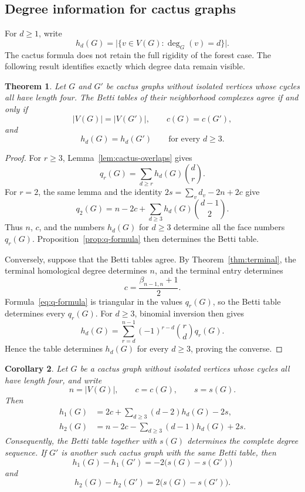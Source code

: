 \documentclass[11pt]{amsart}
\newtheorem{theorem}{Theorem}[section]
\newtheorem{corollary}[theorem]{Corollary}
\theoremstyle{definition}
\theoremstyle{remark}
\numberwithin{equation}{section}
\begin{document}
	\subsection{Degree information for cactus graphs}

	For \(d\ge1\), write
	\[
	h_d(G)=\bigl|\{v\in V(G):\deg_G(v)=d\}\bigr|.
	\]
	The cactus formula does not retain the full rigidity of the forest case. The
	following result identifies exactly which degree data remain visible.

	\begin{theorem}\label{thm:cactus-rigidity}
		Let \(G\) and \(G'\) be cactus graphs without isolated vertices whose cycles
		all have length four. The Betti tables of their neighborhood complexes agree
		if and
		only if
		\[
		|V(G)|=|V(G')|,\qquad c(G)=c(G'),
		\]
		and
		\[
		h_d(G)=h_d(G')\qquad\text{for every }d\ge3.
		\]
	\end{theorem}

	\begin{proof}
		For \(r\ge3\), Lemma~\ref{lem:cactus-overlaps} gives
		\[
		q_r(G)=\sum_{d\ge r}h_d(G)\binom{d}{r}.
		\]
		For \(r=2\), the same lemma and the identity
		\(2s=\sum_v d_v-2n+2c\) give
		\begin{equation}\label{eq:cactus-q2}
		q_2(G)
		=n-2c+\sum_{d\ge3}h_d(G)\binom{d-1}{2}.
		\end{equation}
		Thus \(n\), \(c\), and the numbers \(h_d(G)\) for \(d\ge3\) determine all
		the face numbers \(q_r(G)\). Proposition~\ref{prop:q-formula} then determines
		the Betti table.

		Conversely, suppose that the Betti tables agree. By
		Theorem~\ref{thm:terminal}, the terminal homological degree determines \(n\),
		and the terminal entry determines
		\[
		c=\frac{\beta_{n-1,n}+1}{2}.
		\]
		Formula~\eqref{eq:q-formula} is triangular in the values \(q_r(G)\), so the
		Betti table determines every \(q_r(G)\). For \(d\ge3\), binomial inversion
		then gives
		\begin{equation}\label{eq:cactus-degree-inversion}
		h_d(G)=
		\sum_{r=d}^{n-1}
		(-1)^{r-d}\binom{r}{d}q_r(G).
		\end{equation}
		Hence the table determines \(h_d(G)\) for every \(d\ge3\), proving the
		converse.
	\end{proof}

	\begin{corollary}\label{cor:cactus-low-degrees}
		Let \(G\) be a cactus graph without isolated vertices whose cycles all have
		length four, and write
		\[
		n=|V(G)|,\qquad c=c(G),\qquad s=s(G).
		\]
		Then
		\begin{align}
		h_1(G)
		&=2c+\sum_{d\ge3}(d-2)h_d(G)-2s,
		\label{eq:cactus-h1}\\
		h_2(G)
		&=n-2c-\sum_{d\ge3}(d-1)h_d(G)+2s.
		\label{eq:cactus-h2}
		\end{align}
		Consequently, the Betti table together with \(s(G)\) determines the complete
		degree sequence. If \(G'\) is another such cactus graph with the same Betti
		table, then
		\[
		h_1(G)-h_1(G')=-2\bigl(s(G)-s(G')\bigr)
		\]
		and
		\[
		h_2(G)-h_2(G')=2\bigl(s(G)-s(G')\bigr).
		\]
	\end{corollary}
\end{document}
